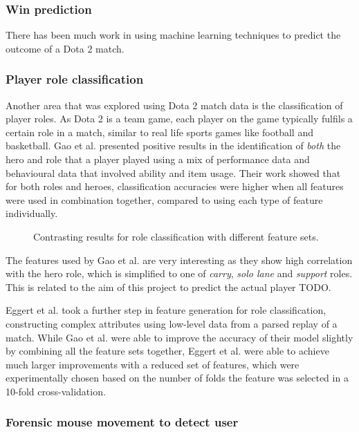 \documentclass[Report.tex]{subfiles}
\begin{document}
\subsubsection{Win prediction}
There has been much work in using machine learning techniques to predict the outcome of a Dota 2 match. \cite{dota-draft} 


\subsubsection{Player role classification}
Another area that was explored using Dota 2 match data is the classification of player roles. As Dota 2 is a team game, each player on the game typically fulfils a certain role in a match, similar to real life sports games like football and basketball. Gao et al. \cite{dota-gao} presented positive results in the identification of \textit{both} the hero and role that a player played using a mix of performance data and behavioural data that involved ability and item usage. Their work showed that for both roles and heroes, classification accuracies were higher when all features were used in combination together, compared to using each type of feature individually.

\begin{figure}[H]
\begin{subfigure}{0.45\textwidth}
\end{subfigure}
\hspace{\fill}
\begin{subfigure}{0.45\textwidth}
\end{subfigure}
\caption{Contrasting results for role classification with different feature sets.}
\end{figure}

The features used by Gao et al. are very interesting as they show high correlation with the hero role, which is simplified to one of \textit{carry}, \textit{solo lane} and \textit{support} roles. This is related to the aim of this project to predict the actual player TODO. 

Eggert et al. \cite{dota-eggert} took a further step in feature generation for role classification, constructing complex attributes using low-level data from a parsed replay of a match. While Gao et al. were able to improve the accuracy of their model slightly by combining all the feature sets together, Eggert et al. were able to achieve much larger improvements with a reduced set of features, which were experimentally chosen based on the number of folds the feature was selected in a 10-fold cross-validation. 
\subsubsection{Forensic mouse movement to detect user}
\end{document}
